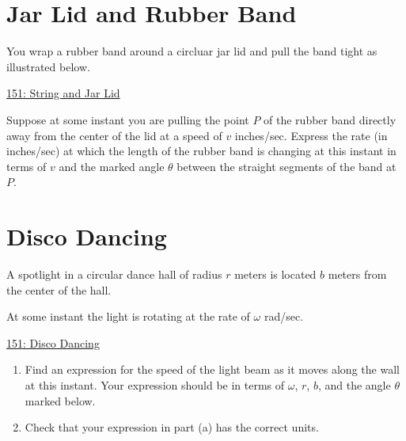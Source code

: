 \documentclass{ximera}
\begin{document}
\section{Jar Lid and Rubber Band}
\begin{question}  \label{Qbnmdfgh}
You wrap a rubber band around a circluar jar lid and pull the band tight as illustrated below.

 
\begin{onlineOnly}
   \begin{center}
\end{center}
\end{onlineOnly}

\href{https://www.desmos.com/calculator/jbku3wrtdq}{151: String and Jar Lid}

Suppose at some instant you are pulling the point $P$ of the rubber band directly away from the center of the lid at a speed of $v$ inches/sec. Express the rate (in inches/sec) at which the length of the rubber band is changing at this instant in terms of $v$ and the marked angle $\theta$ between the straight segments of the band at $P$.
\end{question}

\section{Disco Dancing}
\begin{question}
A spotlight in a circular dance hall of radius $r$ meters is located $b$ meters from the center of the hall. 

At some instant the light is rotating at the rate of $\omega$ rad/sec. 

\begin{onlineOnly}
   \begin{center}
\end{center}
\end{onlineOnly}

\href{https://www.desmos.com/calculator/m2o267u9ur}{151: Disco Dancing}


\begin{enumerate}
\item Find an expression for the speed of the light beam as it moves along the wall at this instant. Your expression should be in terms of $\omega$, $r$, $b$, and the angle $\theta$ marked below.

\item Check that your expression in  part (a) has the correct units.

\end{enumerate}

\end{question}
\end{document}
